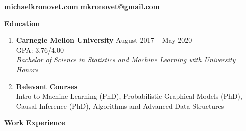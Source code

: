 \documentclass[letterpaper,11pt]{article}
\makeatletter
\newlength{\outerbordwidth}
\newcommand{\resheading}[1]{\vspace{0pt} %
  \parbox{\textwidth}{\setlength{\FrameSep}{\outerbordwidth}
    \begin{shaded}
\setlength{\fboxsep}{0pt}\framebox[\textwidth][l]{\setlength{\fboxsep}{3.5pt}\fcolorbox{shadecolorB}{shadecolorB}{\textbf{\sffamily{\mbox{~}\makebox[7.262in][l]{\large #1} \vphantom{p\^{E}}}}}} %
    \end{shaded}
  }\vspace{-7pt} %
}
\newcommand{\ressubheading}[5]{
\begin{tabular*}{6.8in}{l@{\cftdotfill{\cftsecdotsep}\extracolsep{\fill}}r}
		\textbf{#1} & {#2} \\
		{#3} \\
		\textit{#4} \\
		\textit{#5} \\
\end{tabular*}\vspace{-6pt}}
\makeatother
\begin{document}
\vspace{-0.175in}
\hspace{0in} \href{https://michaelkronovet.com}{\textbf{\Large \textcolor{myGreen}{michaelkronovet.com}}} \hfill \textbf{\Large mkronovet@gmail.com} \\
\vspace{-0.1in}
\begin{mybox}
	\hspace{-8pt} \textbf{Education}
\end{mybox}


\vspace{-10pt}
\begin{enumerate}[leftmargin=10pt]

	\item[] \textbf{Carnegie Mellon University} \cftdotfill{\cftdotsep} August 2017 -- May 2020\\
	GPA: 3.76/4.00 \\
	\textit{Bachelor of Science in Statistics and Machine Learning with University Honors} \\
	\vspace{-0.3pt}
	\item[] \textbf{Relevant Courses} \\
	Intro to Machine Learning (PhD), Probabilistic Graphical Models (PhD), Causal Inference (PhD), Algorithms and Advanced Data Structures \\
	\vspace{-0.01pt}
	
\end{enumerate}

\vspace{-10pt}

\begin{mybox}
	\hspace{-8pt} \textbf{Work Experience}
\end{mybox}
\end{document}
